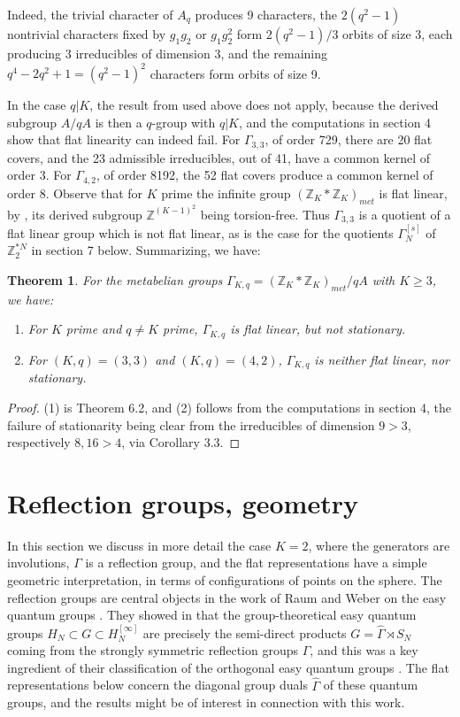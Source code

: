 \documentclass[12pt]{amsart}
\newtheorem{theorem}{Theorem}[section]
\theoremstyle{definition}
\begin{document}
Indeed, the trivial character of $A_q$ produces 9 characters, the $2(q^2-1)$ nontrivial characters fixed by $g_1g_2$ or $g_1g_2^2$ form $2(q^2-1)/3$ orbits of size 3, each producing 3 irreducibles of dimension 3, and the remaining $q^4-2q^2+1=(q^2-1)^2$ characters form orbits of size 9.

In the case $q|K$, the result from \cite{bc2} used above does not apply, because the derived subgroup $A/qA$ is then a $q$-group with $q|K$, and the computations in section 4 show that flat linearity can indeed fail. For $\Gamma_{3,3}$, of order 729, there are 20 flat covers, and the 23 admissible irreducibles, out of 41, have a common kernel of order 3. For $\Gamma_{4,2}$, of order 8192, the 52 flat covers produce a common kernel of order 8. Observe that for $K$ prime the infinite group $(\mathbb Z_K*\mathbb Z_K)_{met}$ is flat linear, by \cite[Theorem 5.6]{bc2}, its derived subgroup $\mathbb Z^{(K-1)^2}$ being torsion-free. Thus $\Gamma_{3,3}$ is a quotient of a flat linear group which is not flat linear, as is the case for the quotients $\Gamma_N^{[s]}$ of $\mathbb Z_2^{*N}$ in section 7 below. Summarizing, we have:

\begin{theorem}
For the metabelian groups $\Gamma_{K,q}=(\mathbb Z_K*\mathbb Z_K)_{met}/qA$ with $K\geq3$, we have:
\begin{enumerate}
\item For $K$ prime and $q\neq K$ prime, $\Gamma_{K,q}$ is flat linear, but not stationary.

\item For $(K,q)=(3,3)$ and $(K,q)=(4,2)$, $\Gamma_{K,q}$ is neither flat linear, nor stationary.
\end{enumerate}
\end{theorem}

\begin{proof}
(1) is Theorem 6.2, and (2) follows from the computations in section 4, the failure of stationarity being clear from the irreducibles of dimension $9>3$, respectively $8,16>4$, via Corollary 3.3.
\end{proof}

\section{Reflection groups, geometry}

In this section we discuss in more detail the case $K=2$, where the generators are involutions, $\Gamma$ is a reflection group, and the flat representations have a simple geometric interpretation, in terms of configurations of points on the sphere. The reflection groups are central objects in the work of Raum and Weber on the easy quantum groups \cite{rw2,rwe}. They showed in \cite{rw2} that the group-theoretical easy quantum groups $H_N\subset G\subset H_N^{[\infty]}$ are precisely the semi-direct products $G=\widehat{\Gamma}\rtimes S_N$ coming from the strongly symmetric reflection groups $\Gamma$, and this was a key ingredient of their classification of the orthogonal easy quantum groups \cite{rwe}. The flat representations below concern the diagonal group duals $\widehat{\Gamma}$ of these quantum groups, and the results might be of interest in connection with this work.
\end{document}
